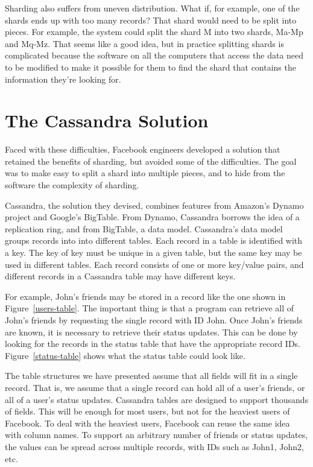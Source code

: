 Sharding also suffers from uneven distribution.
What if, for example, one of the shards ends up with too many records?
That shard would need to be split into pieces.
For example, the system could
split the shard M into two shards, Ma-Mp and Mq-Mz.
That seems like a good idea, but in practice splitting shards
is complicated because the software on all the computers that access the data
need to be modified to make it possible for them 
to find the shard that contains the information they're looking for.

\section{The Cassandra Solution}

Faced with these difficulties, Facebook engineers developed a solution that
retained the benefits of sharding, but avoided some of the difficulties.
The goal was to make easy to split a shard into multiple pieces,
and to hide from the software the complexity of sharding.

Cassandra, the solution they devised, combines features 
from Amazon's Dynamo project and Google's BigTable.  
From Dynamo, Cassandra borrows the idea of a replication ring,
and from BigTable, a data model.
Cassandra's data model groups records into into different tables.
Each record in a table is identified with a key.
The key of key must be unique in a given table, but the same key may be used in different tables.
Each record consists of one or more key/value pairs, and
different records in a Cassandra table may have different keys.

For example, John's friends may be stored in a record like the one shown in Figure~\ref{users-table}.
The important thing is that a program can retrieve
all of John's friends by requesting the single record with ID John.
Once John's friends are known, it is necessary to retrieve their status updates.
This can be done by looking for the records in the status table that have the appropriate record IDs.  
Figure~\ref{status-table} shows what the status table could look like.

The table structures we have presented assume that all fields will fit in a single record.
That is, we assume that a single record can hold all of a user's friends, or all of a user's status updates.
Cassandra tables are designed to support thousands of fields.
This will be enough for most users, but not for the heaviest users of Facebook.
To deal with the heaviest users, Facebook can reuse the same idea with column names.
To support an arbitrary number of friends or status updates,
the values can be spread across multiple records, with IDs such as John1, John2, etc.

